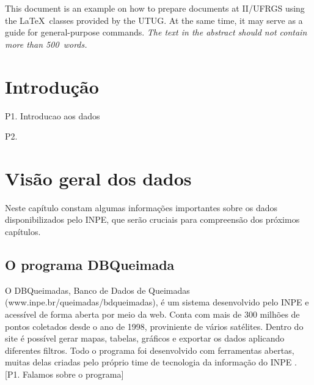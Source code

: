 \documentclass[cic,tc]{iiufrgs}
\begin{document}
\listoffigures

\listoftables

\begin{abstract}
Este documento é um exemplo de como formatar documentos para o
Instituto de Informática da UFRGS usando as classes \LaTeX\
disponibilizadas pelo UTUG\@. Ao mesmo tempo, pode servir de consulta
para comandos mais genéricos. \emph{O texto do resumo não deve
conter mais do que 500 palavras.}
\end{abstract}

\begin{translatedabstract}
This document is an example on how to prepare documents at II/UFRGS
using the \LaTeX\ classes provided by the UTUG\@. At the same time, it
may serve as a guide for general-purpose commands. \emph{The text in
the abstract should not contain more than 500~words.}
\end{translatedabstract}


\chapter{Introdução}
P1. Introducao aos dados \par
P2. 


\chapter{Visão geral dos dados}

Neste capítulo constam algumas informações importantes sobre os 
dados disponibilizados pelo INPE, que serão cruciais para compreensão 
dos próximos capítulos. 

\section{O programa DBQueimada}

O DBQueimadas, Banco de Dados de Queimadas (www.inpe.br/queimadas/bdqueimadas),
é um sistema desenvolvido pelo INPE e acessível de forma aberta por meio da web. 
Conta com mais de 300 milhões de pontos coletados desde o ano de 1998, 
proviniente de vários satélites. Dentro do site é possível gerar mapas,
tabelas, gráficos e exportar os dados aplicando diferentes filtros. Todo o 
programa foi desenvolvido com ferramentas abertas, muitas delas 
criadas pelo próprio time de tecnologia da informação do INPE 
\citep{setzer2019banco}. [P1. Falamos sobre o programa] \par
\end{document}
